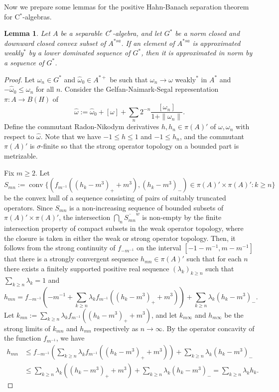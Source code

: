 \documentclass[a4paper]{amsart}
\theoremstyle{plain}
\newtheorem{lem}[thm]{Lemma}
\theoremstyle{definition}
\begin{document}
Now we prepare some lemmas for the positive Hahn-Banach separation theorem for C$^*$-algebras.


\begin{lem}\label{lower dominated sequence}
Let $A$ be a separable C$^*$-algebra, and let $G^*$ be a norm closed and downward closed convex subset of $A^{*sa}$.
If an element of $A^{*sa}$ is approximated weakly$^*$ by a lower dominated sequence of $G^*$, then it is approximated in norm by a sequence of $G^*$.
\end{lem}
\begin{proof}
Let $\omega_n\in G^*$ and $\widehat\omega_0\in A^{*+}$ be such that $\omega_n\to\omega$ weakly$^*$ in $A^*$ and $-\widehat\omega_0\le\omega_n$ for all $n$.
Consider the Gelfan-Naimark-Segal representation $\pi:A\to B(H)$ of
\[\widehat\omega:=\widehat\omega_0+[\omega]+\sum_n2^{-n}\frac{[\omega_n]}{1+\|\omega_n\|}.\]
Define the commutant Radon-Nikodym derivatives $h,h_n\in\pi(A)'$ of $\omega,\omega_n$ with respect to $\widehat\omega$.
Note that we have $-1\le h\le1$ and $-1\le h_n$, and the commutant $\pi(A)'$ is $\sigma$-finite so that the strong operator topology on a bounded part is metrizable.




Fix $m\ge2$.
Let
\[S_{mn}:=\operatorname{conv}\{(f_{m^{-1}}((h_k-m^3)_++m^3),(h_k-m^3)_-)\in\pi(A)'\times\pi(A)':k\ge n\}\]
be the convex hull of a sequence consisting of pairs of suitably truncated operators.
Since $S_{mn}$ is a non-increasing sequence of bounded subsets of $\pi(A)'\times\pi(A)'$, the intersection $\bigcap_n\overline{S_{mn}}^w$ is non-empty by the finite intersection property of compact subsets in the weak operator topology, where the closure is taken in either the weak or strong operator topology.
Then, it follows from the strong continuity of $f_{-m^{-1}}$ on the interval $[-1-m^{-1},m-m^{-1}]$ that there is a strongly convergent sequence $h_{mn}\in\pi(A)'$ such that for each $n$ there exists a finitely supported positive real sequence $(\lambda_k)_{k\ge n}$ such that $\sum_{k\ge n}\lambda_k=1$ and
\[h_{mn}=f_{-m^{-1}}\left(-m^{-1}+\sum_{k\ge n}\lambda_kf_{m^{-1}}((h_k-m^3)_++m^3)\right)+\sum_{k\ge n}\lambda_k(h_k-m^3)_-.\]
Let $k_{mn}:=\sum_{k\ge n}\lambda_kf_{m^{-1}}((h_k-m^3)_++m^3)$, and let $k_{m\infty}$ and $h_{m\infty}$ be the strong limits of $k_{mn}$ and $h_{mn}$ respectively as $n\to\infty$.
By the operator concavity of the function $f_{m^{-1}}$, we have
\begin{align*}
h_{mn}
&\le f_{-m^{-1}}\left(\sum_{k\ge n}\lambda_kf_{m^{-1}}((h_k-m^3)_++m^3)\right)+\sum_{k\ge n}\lambda_k(h_k-m^3)_-\\
&\le\sum_{k\ge n}\lambda_k((h_k-m^3)_++m^3)+\sum_{k\ge n}\lambda_k(h_k-m^3)_-=\sum_{k\ge n}\lambda_kh_k.
\end{align*}



\end{proof}
\end{document}
